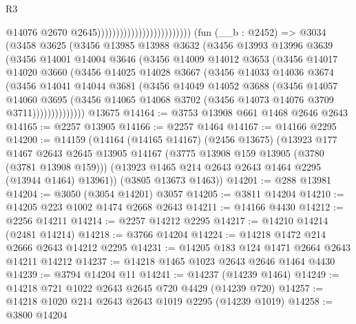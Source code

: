 \begin{lexlean}{R3}
\begin{coremodule}
                                                      @14076
                                                      @2670
                                                      @2645)))))))))))))))))))))))))
    (fun (__b : @2452) =>
    @3034
      (@3458
        @3625
        (@3456
          @13985
          @13988
          @3632
          (@3456
            @13993
            @13996
            @3639
            (@3456
              @14001
              @14004
              @3646
              (@3456
                @14009
                @14012
                @3653
                (@3456
                  @14017
                  @14020
                  @3660
                  (@3456
                    @14025
                    @14028
                    @3667
                    (@3456
                      @14033
                      @14036
                      @3674
                      (@3456
                        @14041
                        @14044
                        @3681
                        (@3456
                          @14049
                          @14052
                          @3688
                          (@3456
                            @14057
                            @14060
                            @3695
                            (@3456
                              @14065
                              @14068
                              @3702
                              (@3456 @14073 @14076 @3709 @3711))))))))))))))
    @13675
@14164 := @3753 @13908 @661 @1468 @2646 @2643
@14165 := @2257 @13905
@14166 := @2257 @1464
@14167 := @14166 @2295
@14200 := @14159
    (@14164
      (@14165 @14167)
      (@2456 @13675)
      (@13923
        @177
        @1467
        @2643
        @2645
        @13905
        @14167
        (@3775 @13908 @159 @13905 (@3780 (@3781 @13908 @159)))
        (@13923 @1465 @214 @2643 @2643 @1464 @2295 (@13944 @1464) @13961))
      (@3805 @13673 @1463))
@14201 := @288 @13981
@14204 := @3050 (@3054 @14201) @3057
@14205 := @3811 @14204
@14210 := @14205 @223 @1002 @1474 @2668 @2643
@14211 := @14166 @4430
@14212 := @2256 @14211
@14214 := @2257 @14212 @2295
@14217 := @14210 @14214 (@2481 @14214)
@14218 := @3766 @14204
@14224 := @14218 @1472 @214 @2666 @2643 @14212 @2295
@14231 := @14205 @183 @124 @1471 @2664 @2643 @14211 @14212
@14237 := @14218 @1465 @1023 @2643 @2646 @1464 @4430
@14239 := @3794 @14204 @11
@14241 := @14237 (@14239 @1464)
@14249 := @14218 @721 @1022 @2643 @2645 @720 @4429 (@14239 @720)
@14257 := @14218 @1020 @214 @2643 @2643 @1019 @2295 (@14239 @1019)
@14258 := @3800 @14204

\end{coremodule}
\end{lexlean}
